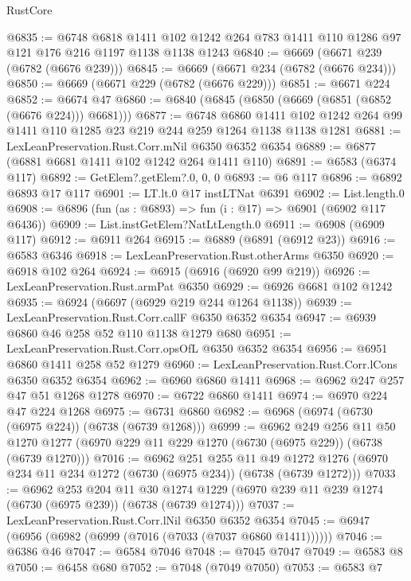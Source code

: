 \begin{lexlean}{RustCore}
\begin{coremodule}
@6835 := @6748
    @6818
    @1411
    @102
    @1242
    @264
    @783
    @1411
    @110
    @1286
    @97
    @121
    @176
    @216
    @1197
    @1138
    @1138
    @1243
@6840 := @6669 (@6671 @239 (@6782 (@6676 @239)))
@6845 := @6669 (@6671 @234 (@6782 (@6676 @234)))
@6850 := @6669 (@6671 @229 (@6782 (@6676 @229)))
@6851 := @6671 @224
@6852 := @6674 @47
@6860 := @6840 (@6845 (@6850 (@6669 (@6851 (@6852 (@6676 @224))) @6681)))
@6877 := @6748
    @6860
    @1411
    @102
    @1242
    @264
    @99
    @1411
    @110
    @1285
    @23
    @219
    @244
    @259
    @1264
    @1138
    @1138
    @1281
@6881 := LexLeanPreservation.Rust.Corr.mNil @6350 @6352 @6354
@6889 := @6877 (@6881 @6681 @1411 @102 @1242 @264 @1411 @110)
@6891 := @6583 (@6374 @117)
@6892 := GetElem?.getElem?.{0, 0, 0}
@6893 := @6 @117
@6896 := @6892 @6893 @17 @117
@6901 := LT.lt.{0} @17 instLTNat @6391
@6902 := List.length.{0}
@6908 := @6896 (fun (as : @6893) => fun (i : @17) => @6901 (@6902 @117 @6436))
@6909 := List.instGetElem?NatLtLength.{0}
@6911 := @6908 (@6909 @117)
@6912 := @6911 @264
@6915 := @6889 (@6891 (@6912 @23))
@6916 := @6583 @6346
@6918 := LexLeanPreservation.Rust.otherArms @6350
@6920 := @6918 @102 @264
@6924 := @6915 (@6916 (@6920 @99 @219))
@6926 := LexLeanPreservation.Rust.armPat @6350
@6929 := @6926 @6681 @102 @1242
@6935 := @6924 (@6697 (@6929 @219 @244 @1264 @1138))
@6939 := LexLeanPreservation.Rust.Corr.callF @6350 @6352 @6354
@6947 := @6939 @6860 @46 @258 @52 @110 @1138 @1279 @680
@6951 := LexLeanPreservation.Rust.Corr.opsOfL @6350 @6352 @6354
@6956 := @6951 @6860 @1411 @258 @52 @1279
@6960 := LexLeanPreservation.Rust.Corr.lCons @6350 @6352 @6354
@6962 := @6960 @6860 @1411
@6968 := @6962 @247 @257 @47 @51 @1268 @1278
@6970 := @6722 @6860 @1411
@6974 := @6970 @224 @47 @224 @1268
@6975 := @6731 @6860
@6982 := @6968 (@6974 (@6730 (@6975 @224)) (@6738 (@6739 @1268)))
@6999 := @6962
    @249
    @256
    @11
    @50
    @1270
    @1277
    (@6970 @229 @11 @229 @1270 (@6730 (@6975 @229)) (@6738 (@6739 @1270)))
@7016 := @6962
    @251
    @255
    @11
    @49
    @1272
    @1276
    (@6970 @234 @11 @234 @1272 (@6730 (@6975 @234)) (@6738 (@6739 @1272)))
@7033 := @6962
    @253
    @204
    @11
    @30
    @1274
    @1229
    (@6970 @239 @11 @239 @1274 (@6730 (@6975 @239)) (@6738 (@6739 @1274)))
@7037 := LexLeanPreservation.Rust.Corr.lNil @6350 @6352 @6354
@7045 := @6947 (@6956 (@6982 (@6999 (@7016 (@7033 (@7037 @6860 @1411))))))
@7046 := @6386 @46
@7047 := @6584 @7046
@7048 := @7045 @7047
@7049 := @6583 @8
@7050 := @6458 @680
@7052 := @7048 (@7049 @7050)
@7053 := @6583 @7

\end{coremodule}
\end{lexlean}
